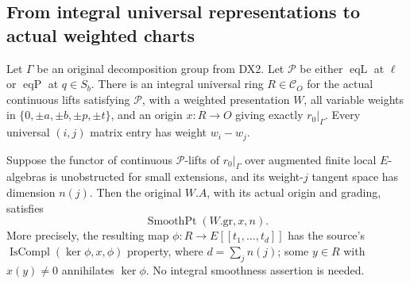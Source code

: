 \subsection{From integral universal representations to actual weighted charts}

\begin{proposition}
\label{claim:DX5}
Let $\Gamma$ be an original decomposition group from DX2.
Let $\mathcal P$ be either $\operatorname{eqL}$ at $\ell$ or
$\operatorname{eqP}$ at $q\in S_b$.
There is an integral universal ring $R\in\mathcal C_O$ for the
actual continuous lifts satisfying $\mathcal P$, with a weighted
presentation $W$, all variable weights in
$\{0,\pm a,\pm b,\pm p,\pm t\}$, and an origin
$x:R\to O$ giving exactly $r_0|_\Gamma$.
Every universal $(i,j)$ matrix entry has weight $w_i-w_j$.

Suppose the functor of continuous $\mathcal P$-lifts of
$r_0|_\Gamma$ over augmented finite local $E$-algebras is
unobstructed for small extensions, and its weight-$j$ tangent
space has dimension $n(j)$.
Then the original $W.\!A$, with its actual origin and grading,
satisfies
\[
                \operatorname{SmoothPt}(W.\mathrm{gr},x,n).
 \tag{DX.23}
\]
More precisely, the resulting map
$\phi:R\to E[[t_1,\ldots,t_d]]$ has the source's
$\operatorname{IsCompl}(\ker\phi,x,\phi)$ property, where
$d=\sum_j n(j)$; some $y\in R$ with $x(y)\ne0$
annihilates $\ker\phi$.
No integral smoothness assertion is needed.
\end{proposition}

